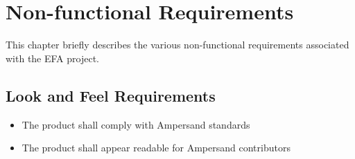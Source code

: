


\chapter{Non-functional Requirements}\label{ch:NonFunc}


This chapter briefly describes the various non-functional requirements associated with the EFA project. 

\section{Look and Feel Requirements}\label{sec:LookAndFeel}
\begin{itemize}
    \item The product shall comply with Ampersand standards
    \item The product shall appear readable for Ampersand contributors
\end{itemize}

